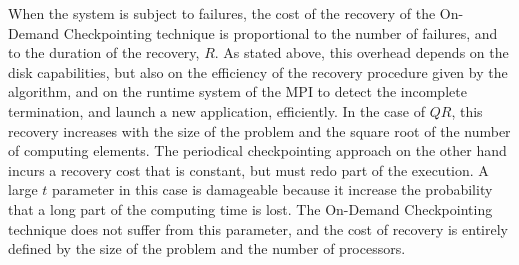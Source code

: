 When the system is subject to failures, the cost of the recovery of
the On-Demand Checkpointing technique is proportional to the number of
failures, and to the duration of the recovery, $R$. As stated above,
this overhead depends on the disk capabilities, but also on the
efficiency of the recovery procedure given by the \abft algorithm, and
on the runtime system of the MPI to detect the incomplete termination,
and launch a new application, efficiently. In the case of $QR$, this
recovery increases with the size of the problem and the square root of
the number of computing elements. The periodical checkpointing
approach on the other hand incurs a recovery cost that is constant,
but must redo part of the execution. A large $t$ parameter in this
case is damageable because it increase the probability that a long
part of the computing time is lost. The On-Demand Checkpointing
technique does not suffer from this parameter, and the cost of
recovery is entirely defined by the size of the problem and the number
of processors.
